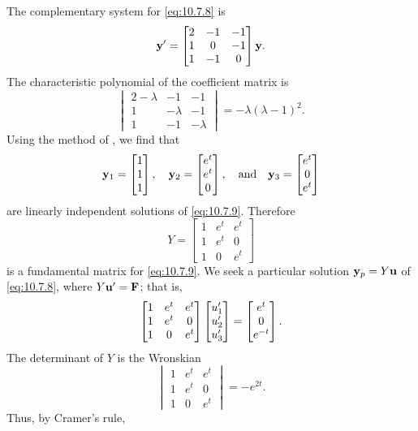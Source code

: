\begin{alistSolution}
\item The complementary system for \eqref{eq:10.7.8} is
\begin{equation} \label{eq:10.7.9}
\mathbf{y}'=\begin{bmatrix}2&-1&-1\\1&0&-1\\1&-1&0\end{bmatrix}\mathbf{y}.
\end{equation}
The characteristic polynomial of the coefficient matrix is
\[
\begin{vmatrix}2-\lambda&-1&-1\\1&-\lambda&-1\\1&-1&-\lambda\end{vmatrix}=
-\lambda(\lambda-1)^2.
\]
Using the method of , we find that
\[
\mathbf{y}_1=\begin{bmatrix}1\\1\\1\end{bmatrix},\quad
\mathbf{y}_2=\begin{bmatrix}e^t\\e^t\\0\end{bmatrix},
\quad\text{and}\quad 
\mathbf{y}_3=\begin{bmatrix}e^t\\0\\e^t\end{bmatrix}
\]
are linearly independent solutions of \eqref{eq:10.7.9}.
Therefore
\[
Y=\begin{bmatrix}1&e^t&e^t\\1&e^t&0\\1&0&e^t\end{bmatrix}
\]
is a fundamental matrix for  \eqref{eq:10.7.9}.
We seek a particular solution  $\mathbf{y}_p=Y\mathbf{u}$ of
\eqref{eq:10.7.8}, where
$Y\mathbf{u}'=\mathbf{F}$; that is,
\[
\begin{bmatrix}1&e^t&e^t\\1&e^t&0\\1&0&e^t\end{bmatrix}
\begin{bmatrix}u_1'\\u_2'\\u_3'\end{bmatrix}=
\begin{bmatrix}e^t\\0\\e^{-t}\end{bmatrix}.
\]
The determinant of $Y$  is the Wronskian
\[
\begin{vmatrix}1&e^t&e^t\\1&e^t&0\\1&0&e^t\end{vmatrix}
=-e^{2t}.
\]
Thus, by Cramer's rule,

\end{alistSolution}
